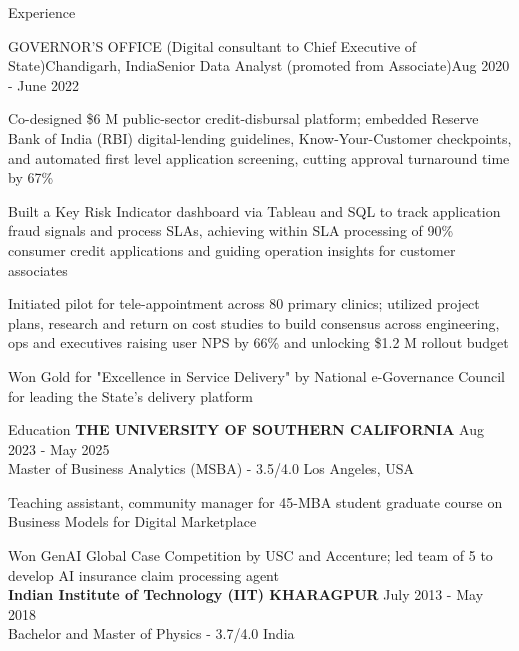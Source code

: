 \documentclass{resume} %
\begin{document}
\begin{rSection}{Experience}
\begin{rSubsection}{GOVERNOR'S OFFICE (Digital consultant to Chief Executive of State)}{Chandigarh, India}{Senior Data Analyst (promoted from Associate)}{Aug 2020 - June 2022}
\item Co-designed \$6 M public-sector credit-disbursal platform; embedded Reserve Bank of India (RBI) digital-lending guidelines, Know-Your-Customer checkpoints, and automated first level application screening, cutting approval turnaround time by 67\%
\item Built a Key Risk Indicator dashboard via Tableau and SQL to track application fraud signals and process SLAs, achieving within SLA processing of 90\% consumer credit applications and guiding operation insights for customer associates
\item Initiated pilot for tele-appointment across 80 primary clinics; utilized project plans, research and return on cost studies to build consensus across engineering, ops and executives raising user NPS by 66\% and unlocking \$1.2 M rollout budget
\item Won Gold for "Excellence in Service Delivery" by National e-Governance Council for leading the State's delivery platform
\end{rSubsection}
\end{rSection}


\begin{rSection}{Education}
{\bf THE UNIVERSITY OF SOUTHERN CALIFORNIA} \hfill {Aug 2023 - May 2025}
\\ Master of Business Analytics (MSBA) - 3.5/4.0 \hfill {Los Angeles, USA}
\item Teaching assistant, community manager for 45-MBA student graduate course on Business Models for Digital Marketplace
\item Won GenAI Global Case Competition by USC and Accenture; led team of 5 to develop AI insurance claim processing agent
\\
{\bf Indian Institute of Technology (IIT) KHARAGPUR} \hfill {July 2013 - May 2018}
\\ Bachelor and Master of Physics - 3.7/4.0 \hfill {India}
\end{rSection}

\end{document}
